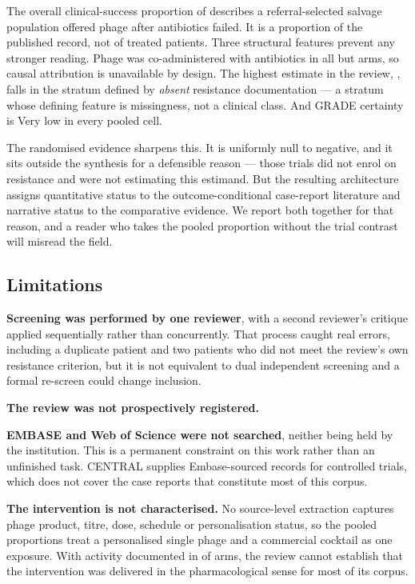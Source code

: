 \documentclass[12pt]{article}
\begin{document}
The overall clinical-success proportion of \CsOverallEst describes a referral-selected salvage population offered phage after antibiotics failed. It is a proportion of the published record, not of treated patients. Three structural features prevent any stronger reading. Phage was co-administered with antibiotics in all but \ModalityMonoArms arms, so causal attribution is unavailable by design. The highest estimate in the review, \CsResNotClassifiableEst, falls in the stratum defined by \emph{absent} resistance documentation --- a stratum whose defining feature is missingness, not a clinical class. And GRADE certainty is Very low in every pooled cell.

The randomised evidence sharpens this. It is uniformly null to negative, and it sits outside the synthesis for a defensible reason --- those trials did not enrol on resistance and were not estimating this estimand. But the resulting architecture assigns quantitative status to the outcome-conditional case-report literature and narrative status to the comparative evidence. We report both together for that reason, and a reader who takes the pooled proportion without the trial contrast will misread the field.

\subsection*{Limitations}

\textbf{Screening was performed by one reviewer}, with a second reviewer's critique applied sequentially rather than concurrently. That process caught real errors, including a duplicate patient and two patients who did not meet the review's own resistance criterion, but it is not equivalent to dual independent screening and a formal re-screen could change inclusion.

\textbf{The review was not prospectively registered.}

\textbf{EMBASE and Web of Science were not searched}, neither being held by the institution. This is a permanent constraint on this work rather than an unfinished task. CENTRAL supplies Embase-sourced records for controlled trials, which does not cover the case reports that constitute most of this corpus.

\textbf{The intervention is not characterised.} No source-level extraction captures phage product, titre, dose, schedule or personalisation status, so the pooled proportions treat a personalised single phage and a commercial cocktail as one exposure. With activity documented in \PhageSuscDocumented of \PhageSuscArms arms, the review cannot establish that the intervention was delivered in the pharmacological sense for most of its corpus.
\end{document}
